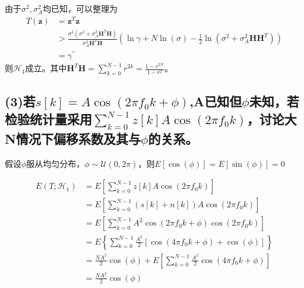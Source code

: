 \documentclass[fontset=windows]{article}
\numberwithin{figure}{section}
\begin{document}
由于\(\sigma^2,\sigma^2_A\)均已知，可以整理为
\begin{align*}
    T(\mathbf{z}) & =\mathbf{z}^T\mathbf{z}                                                                       \\
                  & >\frac{\sigma^2(\sigma^2+\sigma^2_A\mathbf{H}^T\mathbf{H})}{\sigma^2_A\mathbf{H}^T\mathbf{H}}
    (\ln \gamma+N\ln (\sigma)-\frac{1}{2}\ln(\sigma^2+\sigma^2_A\mathbf{HH}^T))                                   \\
                  & =\gamma^{\prime\prime}
\end{align*}
则\(\mathcal{H}_1\)成立。其中\(\mathbf{H}^T\mathbf{H}=\sum_{k=0}^{N-1}r^{2k}=\frac{1-r^{2N}}{1-r^2}\)。


\subsection*{(3)若\(s[k]=A\cos(2\pi f_0 k+\phi )\),A已知但\(\phi\)未知，若检验统计量采用\(\sum_{k=0}^{N-1}z[k]A\cos(2\pi f_0 k)\)，讨论大N情况下偏移系数及其与\(\phi\)的关系。}
假设\(\phi\)服从均匀分布，\(\phi\sim \mathcal{U}(0,2\pi)\)，则\(E\left[\cos(\phi)\right]=E\left[\sin(\phi)\right]=0\)

\begin{align*}
    E(T;\mathcal{H}_1)
     & =E\left[\sum_{k=0}^{N-1}z[k]A\cos (2\pi f_0 k)\right]                                        \\
     & =E\left[\sum_{k=0}^{N-1}(s[k]+n[k])A\cos (2\pi f_0 k)\right]                                 \\
     & =E\left[\sum_{k=0}^{N-1}A^2\cos(2\pi f_0 k+\phi)\cos (2\pi f_0 k)\right]                     \\
     & =E\left\{\sum_{k=0}^{N-1}\frac{A^2}{2}\left[\cos(4\pi f_0 k+\phi)+\cos (\phi)\right]\right\} \\
     & =\frac{NA^2}{2}\cos(\phi)+E\left[\sum_{k=0}^{N-1}\frac{A^2}{2}\cos(4\pi f_0 k+\phi)\right]   \\
     & =\frac{NA^2}{2}\cos(\phi)
\end{align*}
\end{document}
